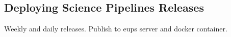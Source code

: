 \subsection{Deploying Science Pipelines Releases}

Weekly and daily releases. Publish to eups server and docker container.
